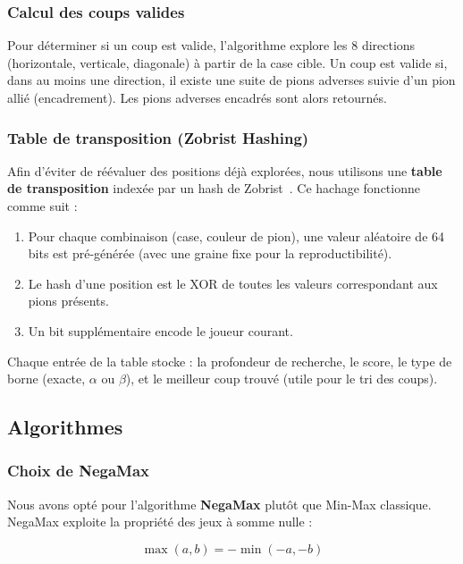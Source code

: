 \documentclass[12pt, a4paper]{article}
\begin{document}
\subsubsection{Calcul des coups valides}

Pour déterminer si un coup est valide, l'algorithme explore les 8 directions (horizontale, verticale, diagonale) à partir de la case cible. Un coup est valide si, dans au moins une direction, il existe une suite de pions adverses suivie d'un pion allié (encadrement). Les pions adverses encadrés sont alors retournés.

\subsubsection{Table de transposition (Zobrist Hashing)}

Afin d'éviter de réévaluer des positions déjà explorées, nous utilisons une \textbf{table de transposition} indexée par un hash de Zobrist~\cite{zobrist1970}. Ce hachage fonctionne comme suit :

\begin{enumerate}
    \item Pour chaque combinaison (case, couleur de pion), une valeur aléatoire de 64 bits est pré-générée (avec une graine fixe pour la reproductibilité).
    \item Le hash d'une position est le XOR de toutes les valeurs correspondant aux pions présents.
    \item Un bit supplémentaire encode le joueur courant.
\end{enumerate}

Chaque entrée de la table stocke : la profondeur de recherche, le score, le type de borne (exacte, $\alpha$ ou $\beta$), et le meilleur coup trouvé (utile pour le tri des coups).


\subsection{Algorithmes}

\subsubsection{Choix de NegaMax}

Nous avons opté pour l'algorithme \textbf{NegaMax} plutôt que Min-Max classique. NegaMax exploite la propriété des jeux à somme nulle :

\begin{equation}
    \max(a, b) = -\min(-a, -b)
\end{equation}
\end{document}
